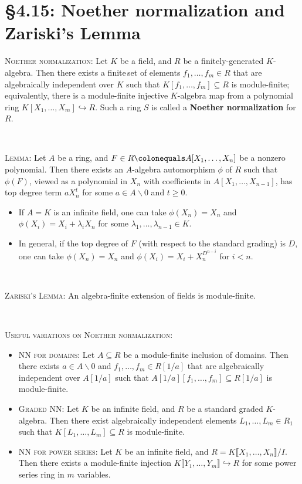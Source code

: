 \documentclass[12pt]{amsart}
\newcommand{\1}{\mathbbm{1}}
\newcommand{\showsol}[1]{\def\displaysol{#1}}
\newcommand\ceq{\colonequals}
\begin{document}
\showsol{0}
	
	\thispagestyle{empty}
	
	\section*{\S4.15: Noether normalization and Zariski's Lemma}	

\begin{framed}

\noindent \textsc{Noether normalization:} Let $K$ be a field, and $R$ be a finitely-generated $K$-algebra. Then there exists a finite\footnotemark\,set of elements $f_1,\dots,f_m\in R$ that are algebraically independent over $K$ such that $K[f_1,\dots,f_m] \subseteq R$ is module-finite; equivalently, there is a module-finite injective $K$-algebra map from a polynomial ring ${K[X_1,\dots,X_m] \hookrightarrow R}$. Such a ring $S$ is called a \textbf{Noether normalization} for~$R$.

\

\noindent \textsc{Lemma:} Let $A$ be a ring, and $F \in R \ceq A[X_1,\dots,X_n]$ be a nonzero polynomial. Then there exists an $A$-algebra automorphism $\phi$ of $R$ such that $\phi(F)$, viewed as a polynomial in $X_n$ with coefficients in $A[X_1,\dots, X_{n-1}]$, has top degree term $a X_n^t$ for some $a\in A\smallsetminus 0$ and $t\geq 0$.
\begin{itemize}
\item If $A=K$ is an infinite field, one can take $\phi(X_n)=X_n$ and $\phi(X_i) = X_i +\lambda_i X_n$ for some $\lambda_1,\dots,\lambda_{n-1} \in K$.
\item In general, if the top degree of $F$ (with respect to the standard grading) is $D$, one can take $\phi(X_n) = X_n$ and $\phi(X_i) = X_i + X_n^{D^{n-i}}$ for $i<n$.
\end{itemize}

\


\noindent \textsc{Zariski's Lemma:} An algebra-finite extension of fields is module-finite.

\

\noindent \textsc{Useful variations on Noether normalization:}
\begin{itemize}
\item \textsc{NN for domains:} Let $A\subseteq R$ be a module-finite inclusion of domains\footnotemark. Then there exists $a\in A\smallsetminus 0$ and $f_1,\dots,f_m\in R[1/a]$ that are algebraically independent over $A[1/a]$ such that $A[1/a][f_1,\dots,f_m] \subseteq R[1/a]$ is module-finite.
\item \textsc{Graded NN:} Let $K$ be an infinite field, and $R$ be a standard graded $K$-algebra. Then there exist algebraically independent elements $L_1,\dots,L_m \in R_1$ such that $K[L_1,\dots,L_m] \subseteq R$ is module-finite.
\item \textsc{NN for power series:} Let $K$ be an infinite field, and $R=K\llbracket X_1,\dots,X_n \rrbracket / I$. Then there exists a module-finite injection $K\llbracket Y_1,\dots,Y_m \rrbracket \hookrightarrow R$ for some power series ring in $m$ variables.
\end{itemize}

 \end{framed}
\end{document}
